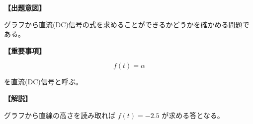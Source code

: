 \noindent \textbf{【出題意図】}

\noindent グラフから直流(DC)信号の式を求めることができるかどうかを確かめる問題である。

\vspace{1em}
\noindent \textbf{【重要事項】}

\[
f(t) = \alpha
\]

\medskip
\noindent を直流(DC)信号と呼ぶ。


\vspace{1em}
\noindent \textbf{【解説】}

\noindent グラフから直線の高さを読み取れば $f(t) = -2.5$ が求める答となる。
